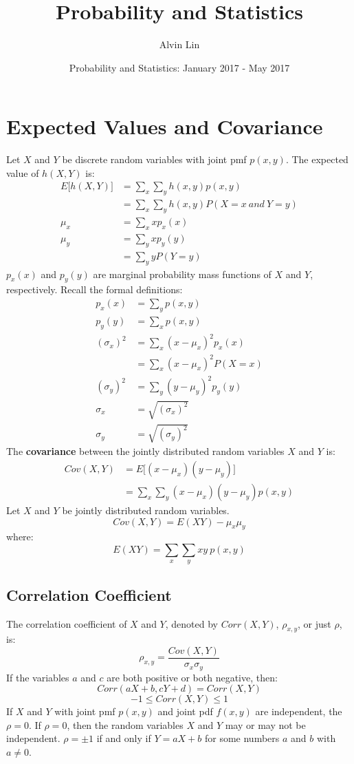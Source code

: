 \documentclass[letterpaper, 12pt]{math}
\title{Probability and Statistics}
\author{Alvin Lin}
\date{Probability and Statistics: January 2017 - May 2017}
\begin{document}
\maketitle

\section*{Expected Values and Covariance}
Let \( X \) and \( Y \) be discrete random variables with joint pmf
\( p(x,y) \). The expected value of \( h(X,Y) \) is:
\begin{align*}
  E\bigg[h(X,Y)\bigg] &= \sum_{x}\sum_{y}h(x,y)p(x,y) \\
  &= \sum_{x}\sum_{y}h(x,y)P(X=x\ and\ Y=y) \\
  \mu_{x} &= \sum_{x}xp_{x}(x) \\
  \mu_{y} &= \sum_{y}xp_{y}(y) \\
  &= \sum_{y}yP(Y=y)
\end{align*}
\( p_{x}(x) \) and \( p_{y}(y) \) are marginal probability mass functions of
\( X \) and \( Y \), respectively. Recall the formal definitions:
\begin{align*}
  p_{x}(x) &= \sum_{y}p(x,y) \\
  p_{y}(y) &= \sum_{x}p(x,y) \\
  (\sigma_{x})^{2} &= \sum_{x}(x-\mu_{x})^{2}p_{x}(x) \\
  &= \sum_{x}(x-\mu_{x})^{2}P(X=x) \\
  (\sigma_{y})^{2} &= \sum_{y}(y-\mu_{y})^{2}p_{y}(y) \\
  \sigma_{x} &= \sqrt{(\sigma_{x})^{2}} \\
  \sigma_{y} &= \sqrt{(\sigma_{y})^{2}}
\end{align*}
The \textbf{covariance} between the jointly distributed random variables
\( X \) and \( Y \) is:
\begin{align*}
  Cov(X,Y) &= E\bigg[(x-\mu_{x})(y-\mu_{y})\bigg] \\
  &= \sum_{x}\sum_{y}(x-\mu_{x})(y-\mu_{y})p(x,y)
\end{align*}
Let \( X \) and \( Y \) be jointly distributed random variables.
\[ Cov(X,Y) = E(XY)-\mu_{x}\mu_{y} \]
where:
\[ E(XY) = \sum_{x}\sum_{y}xy\ p(x,y) \]

\subsection*{Correlation Coefficient}
The correlation coefficient of \( X \) and \( Y \), denoted by \( Corr(X,Y) \),
\( \rho_{x,y} \), or just \( \rho \), is:
\[ \rho_{x,y} = \frac{Cov(X,Y)}{\sigma_{x}\sigma_{y}} \]
If the variables \( a \) and \( c \) are both positive or both negative, then:
\[ Corr(aX+b,cY+d) = Corr(X,Y) \]
\[ -1\leq Corr(X,Y) \leq 1 \]
If \( X \) and \( Y \) with joint pmf \( p(x,y) \) and joint pdf \( f(x,y) \)
are independent, the \( \rho = 0 \). If \( \rho = 0 \), then the random
variables \( X \) and \( Y \) may or may not be independent. \( \rho = \pm1 \)
if and only if \( Y = aX+b \) for some numbers \( a \) and \( b \) with
\( a \neq 0 \).
\end{document}
